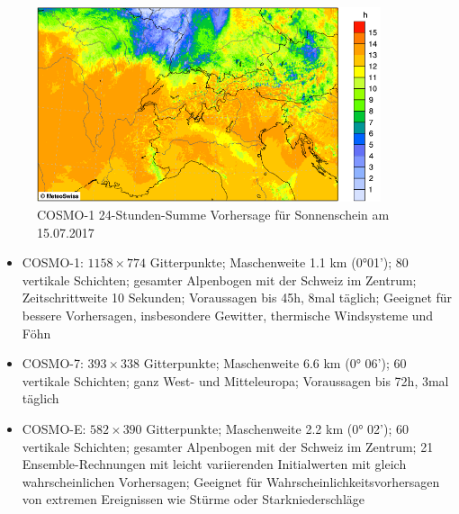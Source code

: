\begin{refsection}
\begin{figure}
\centering
\includegraphics[width=0.9\textwidth]{klima/cosmo1.png}
\caption{COSMO-1 24-Stunden-Summe Vorhersage für Sonnenschein am 15.07.2017 \cite{klima:meteoschweiz}
\label{klima:wettervorhersagen:cosmo}}
\end{figure}

\begin{itemize}
\item COSMO-1: $1158 \times 774$ Gitterpunkte; Maschenweite 1.1 km (0°01'); 80 vertikale Schichten; gesamter Alpenbogen mit der Schweiz im Zentrum; Zeitschrittweite 10 Sekunden; Voraussagen bis 45h, 8mal täglich; Geeignet für bessere Vorhersagen, insbesondere Gewitter, thermische Windsysteme und Föhn \cite{klima:meteoschweiz}
\item COSMO-7: $393 \times 338$ Gitterpunkte; Maschenweite 6.6 km (0° 06'); 60 vertikale Schichten; ganz West- und Mitteleuropa; Voraussagen bis 72h, 3mal täglich \cite{klima:meteoschweiz} 
\item COSMO-E: $582 \times 390$ Gitterpunkte; Maschenweite 2.2 km (0° 02'); 60 vertikale Schichten; gesamter Alpenbogen mit der Schweiz im Zentrum; 21 Ensemble-Rechnungen mit leicht variierenden Initialwerten mit gleich wahrscheinlichen Vorhersagen; Geeignet für Wahrscheinlichkeitsvorhersagen von extremen Ereignissen wie Stürme oder Starkniederschläge \cite{klima:meteoschweiz} 
\end{itemize}


\end{refsection}

